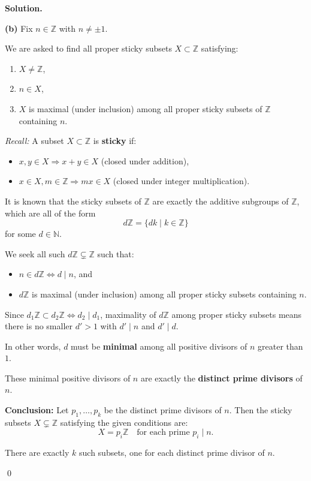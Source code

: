 \documentclass[12pt]{article}
\newenvironment{solution}{%
	\par\medskip
	\noindent\textbf{Solution.}\par\nopagebreak
}{%
	\hfill \qed \par\medskip
}
\begin{document}
\begin{solution}
		\textbf{(b)} Fix $n \in \mathbb{Z}$ with $n \ne \pm 1$.
		
		We are asked to find all proper sticky subsets $X \subset \mathbb{Z}$ satisfying:
		\begin{enumerate}[label=(\roman*)]
			\item $X \ne \mathbb{Z}$,
			\item $n \in X$,
			\item $X$ is maximal (under inclusion) among all proper sticky subsets of $\mathbb{Z}$ containing $n$.
		\end{enumerate}
		
		\textit{Recall:} A subset $X \subset \mathbb{Z}$ is \textbf{sticky} if:
		\begin{itemize}
			\item $x, y \in X \Rightarrow x + y \in X$ (closed under addition),
			\item $x \in X, m \in \mathbb{Z} \Rightarrow mx \in X$ (closed under integer multiplication).
		\end{itemize}
		
		It is known that the sticky subsets of $\mathbb{Z}$ are exactly the additive subgroups of $\mathbb{Z}$, which are all of the form
		\[
		d\mathbb{Z} = \{dk \mid k \in \mathbb{Z}\}
		\]
		for some $d \in \mathbb{N}$.
		
		We seek all such $d\mathbb{Z} \subsetneq \mathbb{Z}$ such that:
		\begin{itemize}
			\item $n \in d\mathbb{Z} \iff d \mid n$, and
			\item $d\mathbb{Z}$ is maximal (under inclusion) among all proper sticky subsets containing $n$.
		\end{itemize}
		
		Since $d_1\mathbb{Z} \subset d_2\mathbb{Z} \iff d_2 \mid d_1$, maximality of $d\mathbb{Z}$ among proper sticky subsets means there is no smaller $d' > 1$ with $d' \mid n$ and $d' \mid d$.
		
		In other words, $d$ must be \textbf{minimal} among all positive divisors of $n$ greater than $1$.
		
		These minimal positive divisors of $n$ are exactly the \textbf{distinct prime divisors} of $n$.
		
		\medskip
		
		\textbf{Conclusion:} Let $p_1, \dots, p_k$ be the distinct prime divisors of $n$. Then the sticky subsets $X \subsetneq \mathbb{Z}$ satisfying the given conditions are:
		\[
		X = p_i\mathbb{Z} \quad \text{for each prime } p_i \mid n.
		\]
		
		There are exactly $k$ such subsets, one for each distinct prime divisor of $n$.
		
	\end{solution}
	
\end{document}
